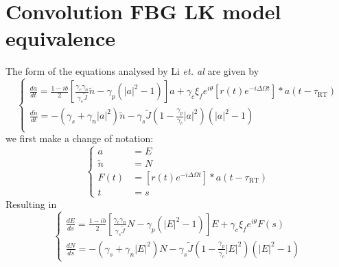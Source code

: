 \section{Convolution FBG LK model equivalence}
\label{sec:Li_chaos_nondim}
%
The form of the equations analysed by Li \textit{et. al} \cite{li2012distributed,li} are given by
%
\begin{equation}
\left\{\begin{array}{l}
\displaystyle \frac{d a}{d t}=\frac{1-i b}{2}\left[\frac{\gamma_{c} \gamma_{n}}{\gamma_{s} \tilde{J}} \tilde{n}-\gamma_{p}\left(|a|^{2}-1\right)\right] a+\gamma_{c} \xi_{f} e^{i \theta}\left[r(t) e^{-i \Delta \Omega t}\right] * a\left(t-\tau_\text{RT}\right) \\
\displaystyle \frac{d \tilde{n}}{d t}=-\left(\gamma_{s}+\gamma_{n}|a|^{2}\right) \tilde{n}-\gamma_{s} \tilde{J}\left(1-\frac{\gamma_{p}}{\gamma_{c}}|a|^{2}\right)\left(|a|^{2}-1\right)\\
\;
\end{array}\right.
\end{equation}
%
we first make a change of notation:
%
\begin{equation*}
\left\{\begin{aligned}
a & =E \\
\tilde{n} & =N \\
F(t) & =\left[r(t) e^{-i \Delta \Omega t}\right] * a\left(t-\tau_\text{RT}\right) \\
t & =s
\end{aligned}\right.
\end{equation*}
%
Resulting in
%
\begin{equation*}
\left\{\begin{array}{l}
\displaystyle \frac{d E}{d s}=\frac{1-ib}{2}\left[\frac{\gamma_{c} \gamma_{n}}{\gamma_{s} \tilde{J}} N-\gamma_{p}\left(|E|^{2}-1\right)\right] E+\gamma_{c} \xi_{f} e^{i\theta} F(s) \\
\displaystyle \frac{d N}{d s}=-\left(\gamma_{s}+\gamma_{n}|E|^{2}\right) N-\gamma_{s} \tilde{J}\left(1-\frac{\gamma_{p}}{\gamma_{c}}|E|^{2}\right)\left(|E|^{2}-1\right)
\end{array}\right.
\end{equation*}
%

